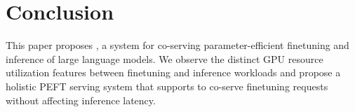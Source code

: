 \section{Conclusion}
This paper proposes \sys, a system for co-serving parameter-efficient finetuning and inference of large language models. We observe the distinct GPU resource utilization features between finetuning and inference workloads and propose a holistic PEFT serving system that supports to co-serve finetuning requests without affecting inference latency.
